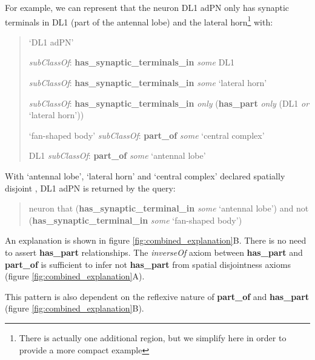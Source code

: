 \documentclass[runningheads,a4paper]{llncs}
\begin{document}
For example, we can represent that the neuron DL1 adPN only has
synaptic terminals in DL1 (part of the antennal lobe) and the lateral
horn\footnote{There is  actually one additional region, but we
  simplify here in order to  provide a more compact example} with:

\begin{quote}
`DL1 adPN'

\textit{subClassOf}: \textbf{has\_synaptic\_terminals\_in}
\textit{some} DL1

\textit{subClassOf}: \textbf{has\_synaptic\_terminals\_in}
\textit{some} `lateral horn'

\textit{subClassOf}: \textbf{has\_synaptic\_terminals\_in}
\textit{only} (\textbf{has\_part} \textit{only} (DL1 \textit{or}
`lateral horn'))

`fan-shaped body' \textit{subClassOf}: \textbf{part\_of} \textit{some}
`central complex'

DL1 \textit{subClassOf}: \textbf{part\_of} \textit{some} `antennal lobe'
\end{quote}

With `antennal lobe', `lateral horn' and  `central complex' declared
spatially disjoint , DL1 adPN is returned by the query:

\begin{quote}
neuron that (\textbf{has\_synaptic\_terminal\_in} \textit{some}
`antennal lobe') and not (\textbf{has\_synaptic\_terminal\_in}
\textit{some} `fan-shaped body')
\end{quote}

An explanation is shown in figure \ref{fig:combined_explanation}B.  There is no need to
assert \textbf{has\_part} relationships. The
\textit{inverseOf} axiom between \textbf{has\_part} and
\textbf{part\_of} is sufficient to infer not \textbf{has\_part} from
spatial disjointness axioms (figure \ref{fig:combined_explanation}A).

This pattern is also dependent on the reflexive nature of
\textbf{part\_of} and \textbf{has\_part} (figure \ref{fig:combined_explanation}B).
\end{document}
